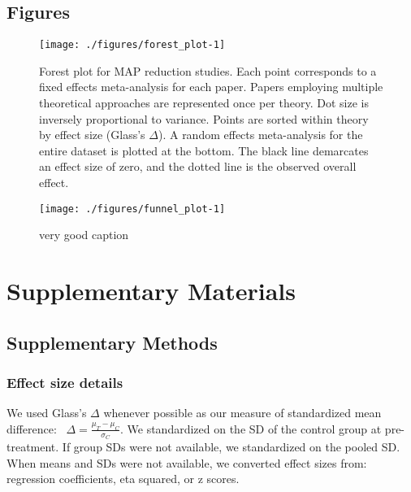 \documentclass[sn-nature,referee,pdflatex]{sn-jnl}
\begin{document}
\FloatBarrier 
\newpage

\subsection{Figures}\label{figures}

\begin{figure}[H]

{\centering \texttt{[image: ./figures/forest\_plot-1]} 

}

\caption{Forest plot for MAP reduction studies. Each point corresponds to a fixed effects meta-analysis for each paper. Papers employing multiple theoretical approaches are represented once per theory. Dot size is inversely proportional to variance. Points are sorted within theory by effect size (Glass's $\Delta$). A random effects meta-analysis for the entire dataset is plotted at the bottom. The black line demarcates an effect size of zero, and the dotted line is the observed overall effect.}\label{fig:forest_plot}
\end{figure}

\begin{figure}
\texttt{[image: ./figures/funnel\_plot-1]} \caption{very good caption }\label{fig:funnel_plot}
\end{figure}

\newpage

\section{Supplementary Materials}\label{Sec5}

\subsection{Supplementary Methods}\label{Sec5.1}

\subsubsection{Effect size details}\label{effect-size-details}

We used Glass's \(\Delta\) whenever possible as our measure of
standardized mean difference:~
\(\Delta = \frac{\mu_T - \mu_C}{\sigma_C}\). We standardized on the SD
of the control group at pre-treatment. If group SDs were not available,
we standardized on the pooled SD. When means and SDs were not available,
we converted effect sizes from: regression coefficients, eta squared, or
z scores.~
\end{document}
